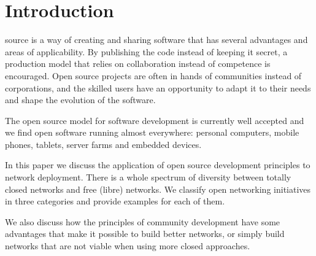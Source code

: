 \documentclass[journal]{IEEEtran}
\begin{document}
%
\IEEEpeerreviewmaketitle



\section{Introduction}
% 
% 
% 
% 
 source is a way of creating and sharing software that has several advantages and areas of applicability.
By publishing the code instead of keeping it secret, a production model that relies on collaboration instead of competence is encouraged.
Open source projects are often in hands of communities instead of corporations, and the skilled users have an opportunity to adapt it to their needs and shape the evolution of the software.

The open source model for software development is currently well accepted and we find open software running almost everywhere: personal computers, mobile phones, tablets, server farms and embedded devices.

In this paper we discuss the application of open source development principles to network deployment.
There is a whole spectrum of diversity between totally closed networks and free (libre) networks.
We classify open networking initiatives in three categories and provide examples for each of them.

We also discuss how the principles of community development have some advantages that make it possible to build better networks, or simply build networks that are not viable when using more closed approaches.

\end{document}
